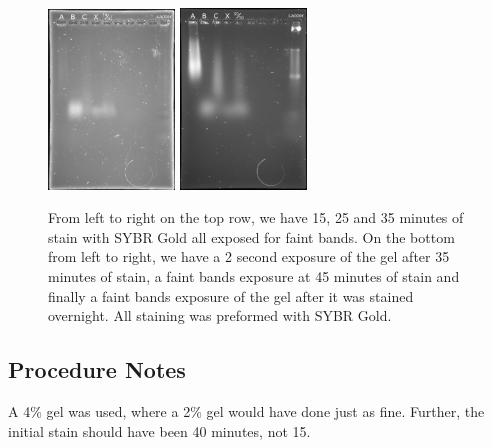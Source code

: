 \documentclass[letterpaper]{article}
\begin{document}
\begin{figure}
\begin{center}
\includegraphics[width=0.3\textwidth]{./gels/view5-stain45min-faintbands-small.png} 
\includegraphics[width=0.3\textwidth]{./gels/view6-stainovernight-faintbands-small.png}
\label{gels}
\caption{From left to right on the top row, we have 15, 25 and 35 minutes of stain with SYBR Gold all exposed for faint bands. On the bottom from left to right, we have a 2 second exposure of the gel after 35 minutes of stain, a faint bands exposure at 45 minutes of stain and finally a faint bands exposure of the gel after it was stained overnight. All staining was preformed with SYBR Gold.}
\end{center}
\end{figure}
\subsection{Procedure Notes}
A 4\% gel was used, where a 2\% gel would have done just as fine. Further, the initial stain should have been 40 minutes, not 15.

\listoffigures


\end{document}

